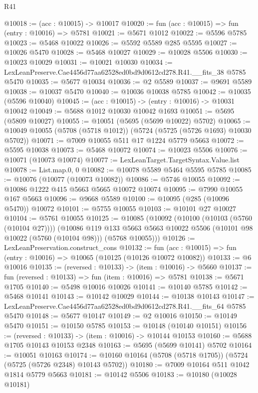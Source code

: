 \begin{lexlean}{R41}
\begin{coremodule}
@10018 := (acc : @10015) -> @10017
@10020 := fun (acc : @10015) => fun (entry : @10016) => @5781
@10021 := @5671 @1012
@10022 := @5596 @5785
@10023 := @5468 @10022
@10026 := @5592 @5589 @285 @5595
@10027 := @10026 @5470
@10028 := @5468 @10027
@10029 := @10028 @5506
@10030 := @10023 @10029
@10031 := @10021 @10030
@10034 := LexLeanPreserve.Cae4456d77aa62528ed0bd9d0612cd278.R41.__fits_38 @5785 @5470
@10035 := @5677 @10034
@10036 := @2 @5589
@10037 := @9691 @5589
@10038 := @10037 @5470
@10040 := @10036 @10038 @5785
@10042 := @10035 (@5596 @10040)
@10045 := (acc : @10015) -> (entry : @10016) -> @10031 @10042
@10049 := @5688 @1012 @10030 @10042 @1693
@10051 := @5695 (@5809 @10027)
@10055 := @10051 (@5695 (@5699 @10022) @5702)
@10065 := @10049 @10055 (@5708 (@5718 @1012)) (@5724 (@5725 (@5726 @1693) @10030 @5702))
@10071 := @7009 @10055 @511 @17 @1224 @5779 @5663
@10072 := @5595 @10038
@10073 := @5468 @10072
@10074 := @10023 @5506
@10076 := @10071 (@10073 @10074)
@10077 := LexLeanTarget.TargetSyntax.Value.list
@10078 := List.map.{0, 0}
@10082 := @10078 @5589 @5464 @5595 @5785
@10085 := @10076 (@10077 (@10073 @10082))
@10086 := @5746 @10055
@10092 := @10086 @1222 @415 @5663 @5665 @10072 @10074
@10095 := @7990 @10055 @167 @5663
@10096 := @9668 @5589
@10100 := @10095 (@285 (@10096 @5470)) @10072
@10101 := @5755 @10055
@10103 := @10101 @27 @10027
@10104 := @5761 @10055
@10125 := @10085
    (@10092
      (@10100 (@10103 (@5760 (@10104 @27))))
      (@10086
        @119
        @133
        @5663
        @5663
        @10022
        @5506
        (@10101 @98 @10022 (@5760 (@10104 @98)))
        (@5768 @10055)))
@10126 := LexLeanPreservation.construct_cons
@10132 := fun (acc : @10015) => fun (entry : @10016) => @10065 (@10125 (@10126 @10072 @10082))
@10133 := @6 @10016
@10135 := (reversed : @10133) -> (item : @10016) -> @5660
@10137 := fun (reversed : @10133) => fun (item : @10016) => @5781
@10138 := @5671 @1705
@10140 := @5498 @10016 @10026
@10141 := @10140 @5785
@10142 := @5468 @10141
@10143 := @10142 @10029
@10144 := @10138 @10143
@10147 := LexLeanPreserve.Cae4456d77aa62528ed0bd9d0612cd278.R41.__fits_64 @5785 @5470
@10148 := @5677 @10147
@10149 := @2 @10016
@10150 := @10149 @5470
@10151 := @10150 @5785
@10153 := @10148 (@10140 @10151)
@10156 := (reversed : @10133) -> (item : @10016) -> @10144 @10153
@10160 := @5688 @1705 @10143 @10153 @2348
@10163 := @5695 (@5699 @10141) @5702
@10164 := @10051 @10163
@10174 := @10160 @10164 (@5708 (@5718 @1705)) (@5724 (@5725 (@5726 @2348) @10143 @5702))
@10180 := @7009 @10164 @511 @1042 @1814 @5779 @5663
@10181 := @10142 @5506
@10183 := @10180 (@10028 @10181)

\end{coremodule}
\end{lexlean}
